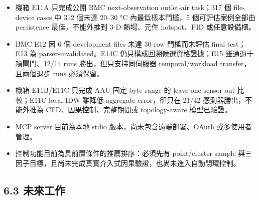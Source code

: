 \documentclass[12pt,a4paper]{article}
\begin{document}
\begin{itemize}
\item 機箱 E11A 只完成公開 BMC next-observation outlet-air task；317 個 file-device cases 中 312 個未達 20–30 °C 內最低樣本門檻，5 個可評估案例全部由 persistence 最佳，不能外推到 3-D 熱場、元件 hotspot、PID 或任意設備櫃。
\item BMC E12 因 6 個 development files 未達 30-row 門檻而未評估 final test；E13 為 parser-invalidated。E14C 仍只構成回溯候選資格證據；E15 雖通過十項閘門、12/14 runs 勝出，但只支持同伺服器 temporal/workload transfer，且兩個退步 runs 必須保留。
\item 機箱 E11B/E11C 只完成 AAU 固定 byte-range 的 leave-one-sensor-out 比較；E11C local IDW 雖降低 aggregate error，卻只在 21/42 感測器勝出，不能外推為 CFD、因果控制、完整期間或 topology-aware 模型已驗證。
\item MCP server 目前為本地 stdio 版本，尚未包含遠端部署、OAuth 或多使用者管理。
\item 控制功能目前為具前置條件的推薦排序：必須先有 point/cluster sample 與三因子目標，且尚未完成真實介入式因果驗證，也尚未進入自動閉環控制。
\end{itemize}

\subsection*{6.3 未來工作}
\end{document}
